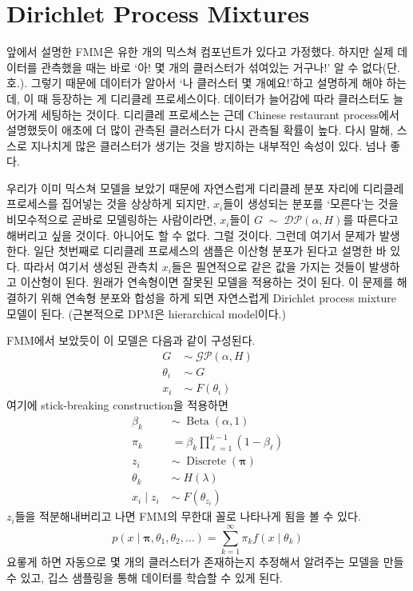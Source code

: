 \documentclass[a4paper, 10pt]{book}
\newcommand{\bs}{\boldsymbol}
\newcommand{\opn}{\operatorname}
\begin{document}
  \section{Dirichlet Process Mixtures}
    앞에서 설명한 FMM은 유한 개의 믹스쳐 컴포넌트가 있다고 가정했다. 하지만 실제 데이터를 관측했을 때는 바로 `아! 몇 개의 클러스터가 섞여있는 거구나!' 알 수 없다(단.호.). 그렇기 때문에 데이터가 알아서 `나 클러스터 몇 개예요!'하고 설명하게 해야 하는데, 이 때 등장하는 게 디리클레 프로세스이다. 데이터가 늘어감에 따라 클러스터도 늘어가게 세팅하는 것이다. 디리클레 프로세스는 근데 Chinese restaurant process에서 설명했듯이 애초에 더 많이 관측된 클러스터가 다시 관측될 확률이 높다. 다시 말해, 스스로 지나치게 많은 클러스터가 생기는 것을 방지하는 내부적인 속성이 있다. 넘나 좋다. \par
    우리가 이미 믹스쳐 모델을 보았기 때문에 자연스럽게 디리클레 분포 자리에 디리클레 프로세스를 집어넣는 것을 상상하게 되지만, $x_{i}$들이 생성되는 분포를 `모른다'는 것을 비모수적으로 곧바로 모델링하는 사람이라면, $x_{i}$들이 $G\;\sim\;\mathcal{DP}\left(\alpha, H\right)$를 따른다고 해버리고 싶을 것이다. 아니어도 할 수 없다. 그럴 것이다. 그런데 여기서 문제가 발생한다. 일단 첫번째로 디리클레 프로세스의 샘플은 이산형 분포가 된다고 설명한 바 있다. 따라서 여기서 생성된 관측치 $x_{i}$들은 필연적으로 같은 값을 가지는 것들이 발생하고 이산형이 된다. 원래가 연속형이면 잘못된 모델을 적용하는 것이 된다. 이 문제를 해결하기 위해 연속형 분포와 합성을 하게 되면 자연스럽게 Dirichlet process mixture 모델이 된다. (근본적으로 DPM은 hierarchical model이다.)\par
    FMM에서 보았듯이 이 모델은 다음과 같이 구성된다.
    \begin{align*}
      G \;&\sim\; \mathcal{GP}\left(\alpha, H\right)\\
      \theta_{i}\;&\sim\; G\\
      x_{i}\;&\sim\;F\left(\theta_{i}\right)
    \end{align*}
    여기에 stick-breaking construction을 적용하면
    \begin{align*}
      \beta_{k}\;&\sim\; \opn{Beta}\left(\alpha, 1\right)\\
      \pi_{k}&= \beta_{k}\prod_{\ell=1}^{k-1}\left(1-\beta_{\ell}\right)\\
      z_{i}\;&\sim\; \opn{Discrete}\left(\bs{\pi}\right)\\
      \theta_{k}\;&\sim\; H\left(\lambda\right)\\
      x_{i}\;|\;z_{i}\;&\sim\; F\left(\theta_{z_{i}}\right)
    \end{align*}
    $z_{i}$들을 적분해내버리고 나면 FMM의 무한대 꼴로 나타나게 됨을 볼 수 있다.
    \begin{equation}
      p\left(x\;|\;\bs{\pi},\theta_{1},\theta_{2},\ldots \right) = \sum_{k=1}^{\infty}\pi_{k}f\left(x\;|\;\theta_{k}\right)
    \end{equation}
    요롷게 하면 자동으로 몇 개의 클러스터가 존재하는지 추정해서 알려주는 모델을 만들 수 있고, 깁스 샘플링을 통해 데이터를 학습할 수 있게 된다.
\end{document}
